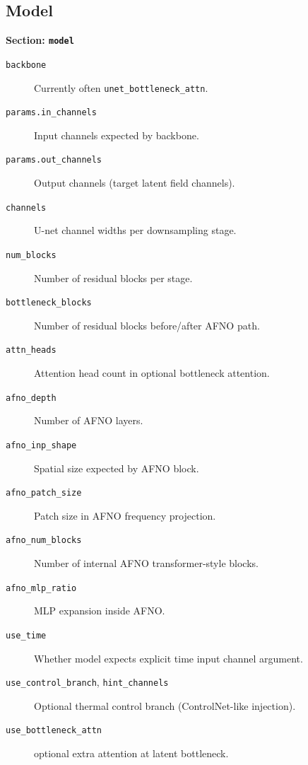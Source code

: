 \documentclass[11pt]{article}
\begin{document}
\subsection{Model}
\textbf{Section: \texttt{model}}
\begin{description}
  \item[\texttt{backbone}] Currently often \texttt{unet\_bottleneck\_attn}.
  \item[\texttt{params.in\_channels}] Input channels expected by backbone.
  \item[\texttt{params.out\_channels}] Output channels (target latent field channels).
  \item[\texttt{channels}] U-net channel widths per downsampling stage.
  \item[\texttt{num\_blocks}] Number of residual blocks per stage.
  \item[\texttt{bottleneck\_blocks}] Number of residual blocks before/after AFNO path.
  \item[\texttt{attn\_heads}] Attention head count in optional bottleneck attention.
  \item[\texttt{afno\_depth}] Number of AFNO layers.
  \item[\texttt{afno\_inp\_shape}] Spatial size expected by AFNO block.
  \item[\texttt{afno\_patch\_size}] Patch size in AFNO frequency projection.
  \item[\texttt{afno\_num\_blocks}] Number of internal AFNO transformer-style blocks.
  \item[\texttt{afno\_mlp\_ratio}] MLP expansion inside AFNO.
  \item[\texttt{use\_time}] Whether model expects explicit time input channel argument.
  \item[\texttt{use\_control\_branch}, \texttt{hint\_channels}] Optional thermal control branch (ControlNet-like injection).
  \item[\texttt{use\_bottleneck\_attn}] optional extra attention at latent bottleneck.
\end{description}
\end{document}
